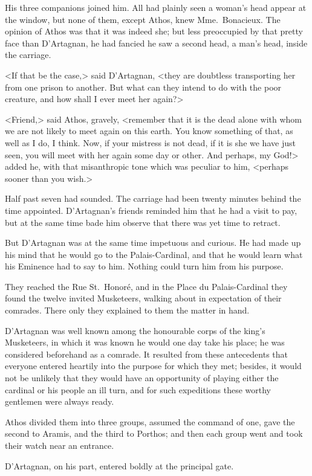 His three companions joined him. All had plainly seen a woman's head appear at the window, but none of them, except Athos, knew Mme.~Bonacieux. The opinion of Athos was that it was indeed she; but less preoccupied by that pretty face than D'Artagnan, he had fancied he saw a second head, a man's head, inside the carriage. 

<If that be the case,> said D'Artagnan, <they are doubtless transporting her from one prison to another. But what can they intend to do with the poor creature, and how shall I ever meet her again?> 

<Friend,> said Athos, gravely, <remember that it is the dead alone with whom we are not likely to meet again on this earth. You know something of that, as well as I do, I think. Now, if your mistress is not dead, if it is she we have just seen, you will meet with her again some day or other. And perhaps, my God!> added he, with that misanthropic tone which was peculiar to him, <perhaps sooner than you wish.> 

Half past seven had sounded. The carriage had been twenty minutes behind the time appointed. D'Artagnan's friends reminded him that he had a visit to pay, but at the same time bade him observe that there was yet time to retract. 

But D'Artagnan was at the same time impetuous and curious. He had made up his mind that he would go to the Palais-Cardinal, and that he would learn what his Eminence had to say to him. Nothing could turn him from his purpose. 

They reached the Rue St.~Honoré, and in the Place du Palais-Cardinal they found the twelve invited Musketeers, walking about in expectation of their comrades. There only they explained to them the matter in hand. 

D'Artagnan was well known among the honourable corps of the king's Musketeers, in which it was known he would one day take his place; he was considered beforehand as a comrade. It resulted from these antecedents that everyone entered heartily into the purpose for which they met; besides, it would not be unlikely that they would have an opportunity of playing either the cardinal or his people an ill turn, and for such expeditions these worthy gentlemen were always ready. 

Athos divided them into three groups, assumed the command of one, gave the second to Aramis, and the third to Porthos; and then each group went and took their watch near an entrance. 

D'Artagnan, on his part, entered boldly at the principal gate. 

